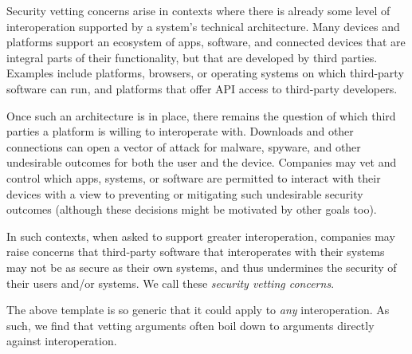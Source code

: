 \documentclass[letterpaper,twocolumn,10pt]{article}
\begin{document}
Security vetting concerns arise in contexts where there is already some level of interoperation supported by a system's technical architecture. Many devices and platforms support an ecosystem of apps, software, and connected devices that are integral parts of their functionality, but that are developed by third parties. Examples include platforms, browsers, or operating systems on which third-party software can run, and platforms that offer API access to third-party developers.

Once such an architecture is in place, there remains the question of which third parties a platform is willing to interoperate with.
Downloads and other connections can open a vector of attack for malware, spyware, and other undesirable outcomes for both the user and the device. Companies may vet and control which apps, systems, or software are permitted to interact with their devices with a view to preventing or mitigating such undesirable security outcomes (although these decisions might be motivated by other goals too).

In such contexts, when asked to support greater interoperation, companies may raise concerns that third-party software that interoperates with their systems may not be as secure as their own systems, and thus undermines the security of their users and/or systems. We call these \emph{security vetting concerns}.

\begin{center}
\end{center}

The above template is so generic that it could apply to \emph{any} interoperation. As such, we find that vetting arguments often boil down to arguments directly against interoperation. 
\end{document}
